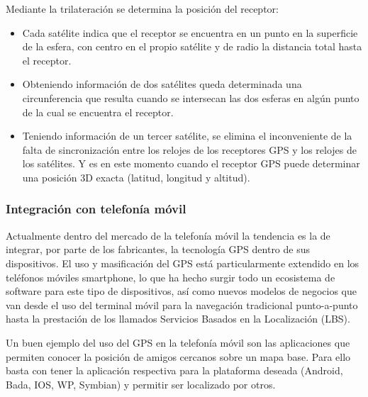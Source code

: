 Mediante la trilateración se determina la posición del receptor:
\begin{itemize}

\item Cada satélite indica que el receptor se encuentra en un punto
 en la superficie de la esfera, con centro en el propio satélite y 
de radio la distancia total hasta el receptor.
\item Obteniendo información de dos satélites queda determinada
 una circunferencia que resulta cuando se intersecan las dos esferas 
en algún punto de la cual se encuentra el receptor.
\item Teniendo información de un tercer satélite, se elimina el 
inconveniente de la falta de sincronización entre los relojes de los
 receptores GPS y los relojes de los satélites. Y es en este momento 
cuando el receptor GPS puede determinar una posición 3D exacta
 (latitud, longitud y altitud).
\end{itemize}
\subsubsection{Integración con telefonía móvil}
Actualmente dentro del mercado de la telefonía móvil la tendencia 
es la de integrar, por parte de los fabricantes, la tecnología GPS 
dentro de sus dispositivos. El uso y masificación del GPS está 
particularmente extendido en los teléfonos móviles smartphone, lo que
 ha hecho surgir todo un ecosistema de software para este tipo de
 dispositivos, así como nuevos modelos de negocios que van desde el
 uso del terminal móvil para la navegación tradicional punto-a-punto 
hasta la prestación de los llamados Servicios Basados en la Localización (LBS).

Un buen ejemplo del uso del GPS en la telefonía móvil son las
aplicaciones que permiten conocer la posición de amigos cercanos sobre
un mapa base. Para ello basta con tener la aplicación respectiva para
la plataforma deseada (Android, Bada, IOS, WP, Symbian) y permitir ser
localizado por otros.
